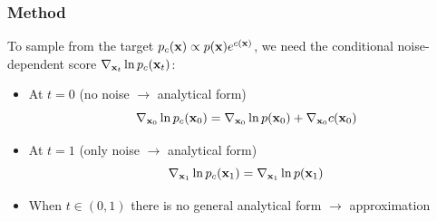 \begin{frame} %
\frametitle{Method}



To sample from the target $p_c(\mathbf{x}) \propto p(\mathbf{x})e^{c(\mathbf{x})}$, we need the conditional noise-dependent score $\nabla_{\mathbf{x}_t} \ln{p_c(\ensuremath{\mathbf{x}}_t)}$:


\begin{itemize}%


    \item At $t=0$ (no noise $\rightarrow$ analytical form) $$\nabla_{\mathbf{x}_0} \ln{p_c(\ensuremath{\mathbf{x}}_0)} =\nabla_{\mathbf{x}_0} \ln{p(\ensuremath{\mathbf{x}}_0)} + \nabla_{\mathbf{x}_0} c(\mathbf{x}_0)$$
    
    \item At $t=1$ (only noise $\rightarrow$ analytical form) $$\nabla_{\mathbf{x}_1} \ln{p_c(\ensuremath{\mathbf{x}}_1)} = \nabla_{\mathbf{x}_1} \ln{p(\ensuremath{\mathbf{x}}_1)}$$ %
    
    \item When $t \in (0,1)$ there is no general analytical form $\rightarrow$ approximation
    
\end{itemize}

\end{frame} %


